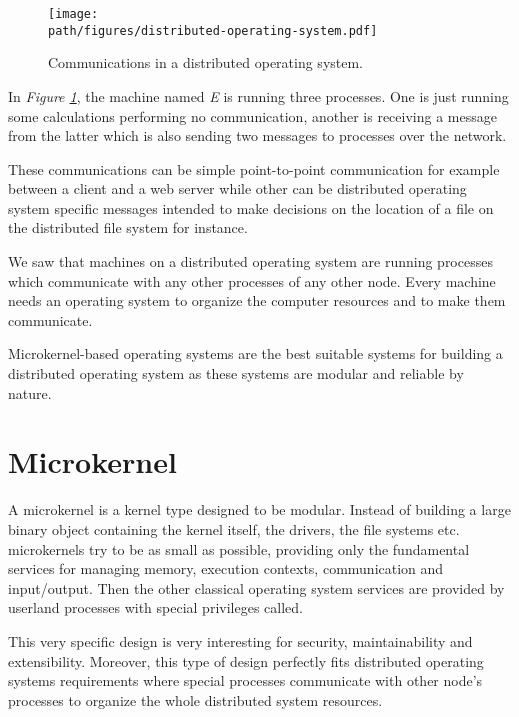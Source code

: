 \begin{figure}[h]
  \begin{center}
    \texttt{[image: \\path/figures/distributed-operating-system.pdf]}
    \caption{Communications in a distributed operating system.}
    \label{figure:distributed-operating-system}
  \end{center}
\end{figure}

In \textit{Figure \ref{figure:distributed-operating-system}}, the machine
named \textit{E} is running three processes. One is just running some
calculations performing no communication, another is receiving a message
from the latter which is also sending two messages to processes over the
network.

These communications can be simple point-to-point communication for example
between a client and a web server while other can be distributed operating
system specific messages intended to make decisions on the location of a file
on the distributed file system for instance.

We saw that machines on a distributed operating system are running processes
which communicate with any other processes of any other node. Every machine
needs an operating system to organize the computer resources and to make
them communicate.

Microkernel-based operating systems are the best suitable systems
for building a distributed operating system as these systems are modular
and reliable by nature.

%
%

\section{Microkernel}

A microkernel is a kernel type designed to be modular. Instead of
building a large binary object containing the kernel itself, the drivers,
the file systems etc. microkernels try to be as small as possible,
providing only the fundamental services for managing memory, execution
contexts, communication and input/output. Then the other classical operating
system services are provided by userland processes with special privileges
called.

This very specific design is very interesting for security, maintainability
and extensibility. Moreover, this type of design perfectly fits
distributed operating systems requirements where special processes
communicate with other node's processes to organize the whole distributed
system resources.

